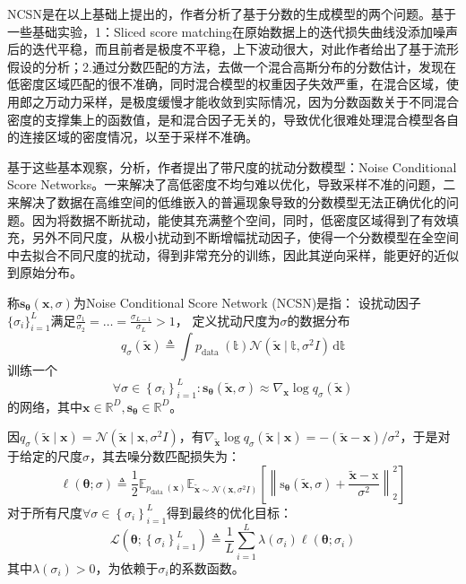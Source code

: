 NCSN是在以上基础上提出的，作者分析了基于分数的生成模型的两个问题。基于一些基础实验，1：Sliced score matching在原始数据上的迭代损失曲线没添加噪声后的迭代平稳，而且前者是极度不平稳，上下波动很大，对此作者给出了基于流形假设的分析；2.通过分数匹配的方法，去做一个混合高斯分布的分数估计，发现在低密度区域匹配的很不准确，同时混合模型的权重因子失效严重，在混合区域，使用郎之万动力采样，是极度缓慢才能收敛到实际情况，因为分数函数关于不同混合密度的支撑集上的函数值，是和混合因子无关的，导致优化很难处理混合模型各自的连接区域的密度情况，以至于采样不准确。

基于这些基本观察，分析，作者提出了带尺度的扰动分数模型：Noise Conditional Score Networks。一来解决了高低密度不均匀难以优化，导致采样不准的问题，二来解决了数据在高维空间的低维嵌入的普遍现象导致的分数模型无法正确优化的问题。因为将数据不断扰动，能使其充满整个空间，同时，低密度区域得到了有效填充，另外不同尺度，从极小扰动到不断增幅扰动因子，使得一个分数模型在全空间中去拟合不同尺度的扰动，得到非常充分的训练，因此其逆向采样，能更好的近似到原始分布。

称$\mathbf{s}_{\boldsymbol{\theta}}(\mathbf{x}, \sigma)$为Noise Conditional Score Network (NCSN)是指：
设扰动因子$\{\sigma_i\}_{i=1}^{L}$满足$\frac{\sigma_1}{\sigma_2}=\dots=\frac{\sigma_{L-1}}{\sigma_L}>1 $，
定义扰动尺度为$\sigma$的数据分布
\begin{equation}
q_\sigma(\tilde{\mathbf{x}}) \triangleq \int p_{\text {data }}(\mathbb{t}) \mathcal{N}(\tilde{\mathbf{x}} \mid \mathbb{t}, \sigma^2I)\,\mathrm d\mathbb t
\end{equation}
训练一个
\begin{equation}
\forall \sigma \in\left\{\sigma_i\right\}_{i=1}^L: \mathbf{s}_{\boldsymbol{\theta}}(\tilde{\mathbf{x}}, \sigma) \approx \nabla_{\mathbf{x}} \log q_\sigma(\tilde{\mathbf{x}})
\end{equation}
的网络，其中$ \mathbf{x} \in \mathbb{R}^{D}, \mathbf{s}_{\boldsymbol{\theta}} \in \mathbb{R}^{D}$。

因$q_\sigma(\tilde{\mathbf{x}} \mid \mathbf{x})=\mathcal{N}\left(\tilde{\mathbf{x}} \mid \mathbf{x}, \sigma^2 I\right)$，有$\nabla_{\tilde{\mathbf{x}}} \log q_\sigma(\tilde{\mathbf{x}} \mid \mathbf{x})=-(\tilde{\mathbf{x}}-\mathbf{x}) / \sigma^2$，于是对于给定的尺度$\sigma$，其去噪分数匹配损失为：
\begin{equation}
\ell(\boldsymbol{\theta} ; \sigma) \triangleq \frac{1}{2} \mathbb{E}_{p_{\text {data }}(\mathbf{x})} \mathbb{E}_{\tilde{\mathbf{x}} \sim \mathcal{N}\left(\mathbf{x}, \sigma^2 I\right)}\left[\left\|\mathrm{s}_{\boldsymbol{\theta}}(\tilde{\mathbf{x}}, \sigma)+\frac{\tilde{\mathbf{x}}-\mathrm{x}}{\sigma^2}\right\|_2^2\right]
\end{equation}
对于所有尺度$\forall \sigma \in\left\{\sigma_i\right\}_{i=1}^L$得到最终的优化目标：
\begin{equation}
\mathcal{L}\left(\boldsymbol{\theta} ;\left\{\sigma_i\right\}_{i=1}^L\right) \triangleq \frac{1}{L} \sum_{i=1}^L \lambda\left(\sigma_i\right) \ell\left(\boldsymbol{\theta} ; \sigma_i\right)
\end{equation}其中$ \lambda\left(\sigma_i\right)>0$，为依赖于$\sigma_i$的系数函数。

